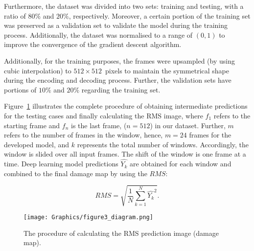 \documentclass{IOS-Book-Article}
\begin{document}
\begin{sloppypar}
	Furthermore, the dataset was divided into two sets: training and testing, with a ratio of \(80\%\) and \(20\% \), respectively.
	Moreover, a certain portion of the training set was preserved as a validation set to validate the model during the training process.
	Additionally, the dataset was normalised to a range of \((0, 1)\) to improve the convergence of the gradient descent algorithm.
	
	Additionally, for the training purposes, the frames were upsampled  (by using cubic interpolation) to \(512\times512\)~pixels to maintain the symmetrical shape during the encoding and decoding process.
	Further, the validation sets have portions of \(10\%\) and \(20\%\) regarding the training set.
	
	Figure~\ref{fig:Diagram_exp_predictions} illustrates the complete procedure of obtaining intermediate predictions for the testing cases and finally calculating the RMS image, where \(f_{1}\) refers to the starting frame and \(f_{n}\) is the last frame, (\(n=512\)) in our dataset.
	Further, \(m\) refers to the number of frames in the window, hence, \(m=24\) frames for the developed model, and \(k\) represents the total number of windows.
	Accordingly, the window is slided over all input frames.
	The shift of the window is one frame at a time.
	Deep learning model predictions \(\hat{Y_k}\) are obtained for each window and combined to the final damage map by using the $RMS$:
	
	\begin{equation}
		RMS = \sqrt{\frac{1}{N}\sum_{k=1}^{N}\hat{Y_k}^2}.	
		\label{RMS}
	\end{equation}
	\begin{figure}[!h]
		\centering
		\texttt{[image: Graphics/figure3\_diagram.png]}
		\caption{The procedure of calculating the RMS prediction image (damage map).}
		\label{fig:Diagram_exp_predictions}
	\end{figure}
\end{sloppypar}
\end{document}
